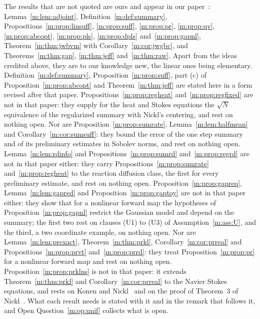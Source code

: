 The results that are not quoted are ours and appear in our paper~\cite{polsonsokolov2026manifold}: Lemma~\ref{m:lem:adjoint}, Definition~\ref{m:def:summary}, Propositions~\ref{m:prop:linsuff}, \ref{m:prop:suff}, \ref{m:prop:pr}, \ref{m:prop:qv}, \ref{m:prop:abcopt}, \ref{m:prop:pls}, \ref{m:prop:dpls} and~\ref{m:prop:gapnl}, Theorem~\ref{m:thm:jwbvm} with Corollary~\ref{m:cor:jwgbc}, and Theorems~\ref{m:thm:gap}, \ref{m:thm:jeff} and~\ref{m:thm:raw}. Apart from the ideas credited above, they are to our knowledge new, the linear ones being elementary. Definition~\ref{m:def:summary}, Proposition~\ref{m:prop:suff}, part (c) of Proposition~\ref{m:prop:abcopt} and Theorem~\ref{m:thm:jeff} are stated here in a form revised after that paper. Propositions~\ref{m:prop:regheat} and~\ref{m:prop:regfixed} are not in that paper: they supply for the heat and Stokes equations the $\sqrt N$ equivalence of the regularized summary with Nickl's centering, and rest on nothing open. Nor are Proposition~\ref{m:prop:sumrate}, Lemma~\ref{m:lem:halfmean} and Corollary~\ref{m:cor:sumsuff}: they bound the error of the one step summary and of its preliminary estimates in Sobolev norms, and rest on nothing open. Lemma~\ref{m:lem:rdinfo} and Propositions~\ref{m:prop:sumrd} and~\ref{m:prop:regrd} are not in that paper either: they carry Propositions~\ref{m:prop:sumrate} and~\ref{m:prop:regheat} to the reaction diffusion class, the first for every preliminary estimate, and rest on nothing open. Proposition~\ref{m:prop:gapreq}, Lemma~\ref{m:lem:gapred} and Proposition~\ref{m:prop:gaptoy} are not in that paper either: they show that for a nonlinear forward map the hypotheses of Proposition~\ref{m:prop:gapnl} restrict the Gaussian model and depend on the summary; the first two rest on clauses (U1) to (U3) of Assumption~\ref{m:ass:U}, and the third, a two coordinate example, on nothing open. Nor are Lemma~\ref{m:lem:prexact}, Theorem~\ref{m:thm:prkl}, Corollary~\ref{m:cor:prreal} and Propositions~\ref{m:prop:prvt} and~\ref{m:prop:prrd}: they treat Proposition~\ref{m:prop:pr} for a nonlinear forward map and rest on nothing open. Proposition~\ref{m:prop:prklns} is not in that paper: it extends Theorem~\ref{m:thm:prkl} and Corollary~\ref{m:cor:prreal} to the Navier Stokes equations, and rests on Konen and Nickl~\cite{konennickl2026} and on the proof of Theorem~3 of Nickl~\cite{nicklbvm2024}. What each result needs is stated with it and in the remark that follows it, and Open Question~\ref{m:op:unif} collects what is open.
